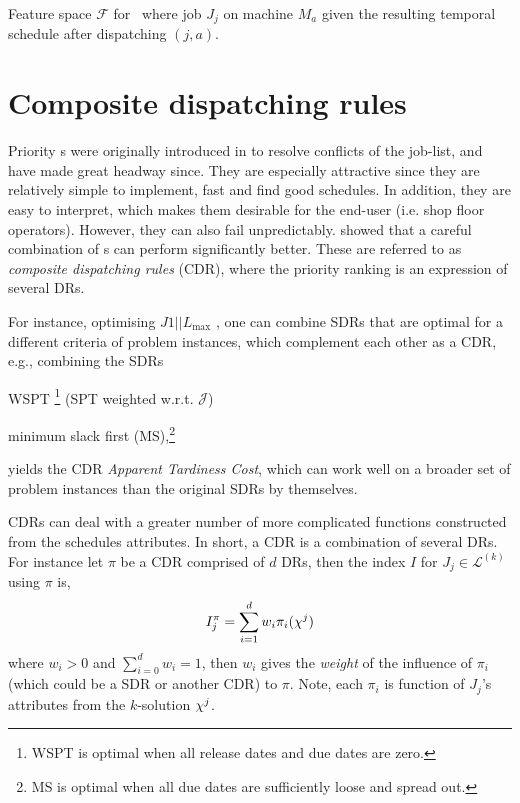 \begin{table} \centering 
    \caption[Feature space $\mathcal{F}$ for \JSP]{Feature space $\mathcal{F}$ 
        for \JSP\ where job $J_j$ on machine $M_a$ given the resulting temporal 
        schedule after dispatching $(j,a)$.}
    \label{tbl:features}
    
\end{table}

\section{Composite dispatching rules}\label{sec:CDR}

Priority \dr s were originally introduced in \citet{Giffler60} to resolve 
conflicts of the job-list, and have made great headway since. 
They are especially attractive since they are relatively simple to 
implement, fast and find good schedules. In addition, they are easy 
to interpret, which makes them desirable for the end-user (i.e. shop floor 
operators). 
However, they can also fail unpredictably. 
\citet{Jayamohan04} showed that a careful combination of \dr s can 
perform significantly better. These are referred to as \emph{composite 
dispatching rules} (CDR), where the priority ranking is an expression of 
several DRs. 

For instance, optimising $J1||L_{\max}$ \cite[see. chapter 14.2]{Pinedo08}, one 
can combine SDRs that are optimal for a different criteria of problem 
instances, which complement each other as a CDR, e.g., combining the SDRs 
\begin{enumerate*}[after={{}}]
    \item WSPT \footnote{WSPT is optimal when all release dates and due dates 
        are zero.} (SPT weighted w.r.t. $\mathcal{J}$)
    \item minimum slack first (MS),\footnote{MS is optimal when all due dates 
        are sufficiently loose and spread out.} 
\end{enumerate*}
yields the CDR \emph{Apparent Tardiness Cost}, which can work well on a 
broader set of problem instances than the original SDRs by themselves.


CDRs can deal with a greater number of more complicated functions constructed 
from the schedules attributes. In short, a CDR is a combination of several DRs. 
For instance let $\pi$ be a CDR comprised of $d$ DRs, then the index $I$ for 
$J_j\in\mathcal{L}^{(k)}$ using $\pi$ is, 
\begin{equation}\label{eq:CDR}
I_j^{\pi} = \sum_{i=1}^d w_i \pi_i(\vchi^j) 
\end{equation}
where $w_i>0$ and $\sum_{i=0}^d w_i = 1$, then $w_i$ gives the \emph{weight} of 
the influence of $\pi_i$ (which could be a SDR or another CDR) to $\pi$. Note, 
each $\pi_i$ is function of $J_j$'s attributes from the $k$-solution ${\mathbf{\chi}}^j$.

